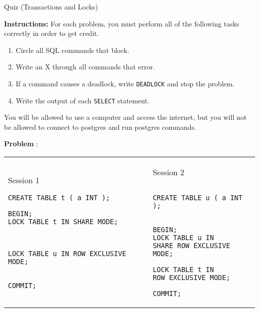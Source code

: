 \documentclass[10pt]{article}
\theoremstyle{definition}
\newcounter{ProblemCounter}
\newcommand{\nextproblem}{\filbreak\stepcounter{ProblemCounter} \noindent\textbf{Problem \theProblemCounter}:}
\begin{document}
\begin{center}
{
\Large
    Quiz (Transactions and Locks)
}

    \vspace{0.1in}
\end{center}

\noindent
\textbf{Instructions:}
For each problem, you must perform all of the following tasks correctly in order to get credit.
\begin{enumerate}
\item Circle all SQL commands that block.
\item Write an X through all commands that error.
\item If a command causes a deadlock, write \lstinline{DEADLOCK} and stop the problem.
\item Write the output of each \lstinline{SELECT} statement.
\end{enumerate}
    You will be allowed to use a computer and access the internet, but you will not be allowed to connect to postgres and run postgres commands.

\vspace{1in}

\nextproblem
\begin{tcolorbox}
\begin{tabular}{p{3.25in}p{3in}}
\hspace{-0.2in}Session 1
\begin{lstlisting}
CREATE TABLE t ( a INT );

BEGIN;
LOCK TABLE t IN SHARE MODE;
  


LOCK TABLE u IN ROW EXCLUSIVE MODE;


COMMIT;
\end{lstlisting}
    &
\hspace{-0.2in}Session 2
\begin{lstlisting}

CREATE TABLE u ( a INT );


BEGIN;
LOCK TABLE u IN
SHARE ROW EXCLUSIVE MODE;

LOCK TABLE t IN
ROW EXCLUSIVE MODE;

COMMIT;

\end{lstlisting}
\end{tabular}
\end{tcolorbox}
\vspace{0.25in}
\end{document}
